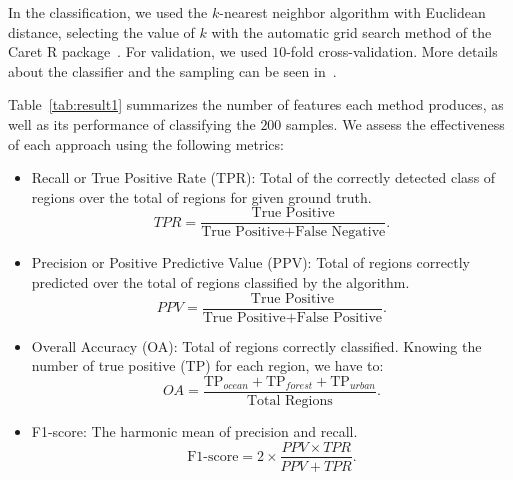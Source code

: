 \documentclass[journal]{IEEEtran}
\begin{document}
\begin{itemize}
	In the classification, we used the $k$-nearest neighbor algorithm with Euclidean distance, selecting the value of $k$ with the automatic grid search method of the Caret R package~\cite{kuhn2008building}.
	For validation, we used $10$-fold cross-validation.
	More details about the classifier and the sampling can be seen in~\cite{mitchell1997machine}.
	
	Table~\ref{tab:result1} summarizes the number of features each method produces, as well as its performance of classifying the $200$ samples.
	We assess the effectiveness of each approach using the following metrics: 
	\begin{itemize}
		\item Recall or True Positive Rate (TPR): Total of the correctly detected class of regions over the total of regions for given ground truth.
		\begin{equation*}
		TPR = \frac{\text{True Positive}}{\text{True Positive} + \text{False Negative}}.
		\end{equation*}
		\item Precision or Positive Predictive Value (PPV): Total of regions correctly predicted over the total of regions classified by the algorithm.
		\begin{equation*}
		PPV = \frac{\text{True Positive}}{\text{True Positive} + \text{False Positive}}.
		\end{equation*}
		\item Overall Accuracy (OA): Total of regions correctly classified. 
		Knowing the number of true positive (TP) for each region, we have to:
		\begin{equation*}
		OA = \frac{\text{TP}_{ocean} + \text{TP}_{forest} + \text{TP}_{urban}}{\text{Total Regions}}.
		\end{equation*}
		\item F1-score: The harmonic mean of precision and recall.
		\begin{equation*}
		\text{F1-score} = 2 \times \frac{PPV \times TPR}{PPV + TPR}.
		\end{equation*}
	\end{itemize}
	

\end{itemize}
\end{document}

